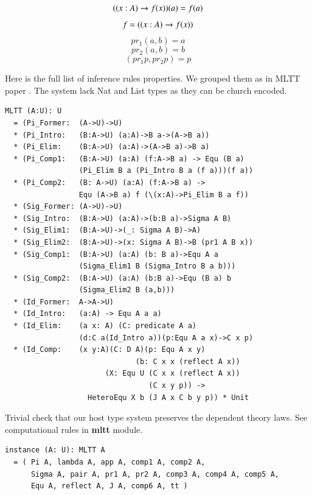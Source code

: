 \documentclass{article}
\begin{document}
\begin{equation} (\\(x:A) \rightarrow f(x))(a) = f(a) \end{equation}
\begin{equation} f = (\\(x:A) \rightarrow f(x)) \end{equation}
\begin{equation} pr_1 (a,b) = a \end{equation}
\begin{equation} pr_2 (a,b) = b \end{equation}
\begin{equation} (pr_1 p,pr_2 p) = p \end{equation}

Here is the full list of inference rules properties.
We grouped them as in MLTT paper \cite{Lof84}. The system lack Nat and List
types as they can be church encoded.

\begin{lstlisting}[mathescape=true]
MLTT (A:U): U
  = (Pi_Former:  (A->U)->U)
  * (Pi_Intro:   (B:A->U) (a:A)->B a->(A->B a))
  * (Pi_Elim:    (B:A->U) (a:A)->(A->B a)->B a)
  * (Pi_Comp1:   (B:A->U) (a:A) (f:A->B a) -> Equ (B a)
                 (Pi_Elim B a (Pi_Intro B a (f a)))(f a))
  * (Pi_Comp2:   (B: A->U) (a:A) (f:A->B a) ->
                 Equ (A->B a) f (\(x:A)->Pi_Elim B a f))
  * (Sig_Former: (A->U)->U)
  * (Sig_Intro:  (B:A->U) (a:A)->(b:B a)->Sigma A B)
  * (Sig_Elim1:  (B:A->U)->(_: Sigma A B)->A)
  * (Sig_Elim2:  (B:A->U)->(x: Sigma A B)->B (pr1 A B x))
  * (Sig_Comp1:  (B:A->U) (a:A) (b: B a)->Equ A a
                 (Sigma_Elim1 B (Sigma_Intro B a b)))
  * (Sig_Comp2:  (B:A->U) (a:A) (b:B a)->Equ (B a) b
                 (Sigma_Elim2 B (a,b)))
  * (Id_Former:  A->A->U)
  * (Id_Intro:   (a:A) -> Equ A a a)
  * (Id_Elim:    (a x: A) (C: predicate A a)
                 (d:C a(Id_Intro a))(p:Equ A a x)->C x p)
  * (Id_Comp:    (x y:A)(C: D A)(p: Equ A x y)
                              (b: C x x (reflect A x))
                       (X: Equ U (C x x (reflect A x))
                                 (C x y p)) ->
                   HeteroEqu X b (J A x C b y p)) * Unit
\end{lstlisting}

Trivial check that our host type system preserves the dependent theory laws.
See computational rules in {\bf mltt} module.

\begin{lstlisting}[mathescape=true]
instance (A: U): MLTT A
  = ( Pi A, lambda A, app A, comp1 A, comp2 A,
      Sigma A, pair A, pr1 A, pr2 A, comp3 A, comp4 A, comp5 A,
      Equ A, reflect A, J A, comp6 A, tt )
\end{lstlisting}
\end{document}
